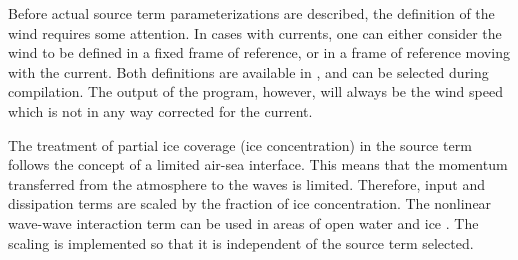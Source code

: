 \vspace{\baselineskip} \noindent
Before actual source term parameterizations are described, the definition of
the wind requires some attention. In cases with currents, one can either
consider the wind to be defined in a fixed frame of reference, or in a frame
of reference moving with the current. Both definitions are available in \ws,
and can be selected during compilation. The output of the program, however,
will always be the wind speed which is not in any way corrected for the
current.

\vspace{\baselineskip} \noindent
The treatment of partial ice coverage (ice concentration) in the source term
follows the concept of a limited air-sea interface. This means that the momentum
transferred from the atmosphere to the waves is limited. Therefore, input and
dissipation terms are scaled by the fraction of ice concentration. The
nonlinear wave-wave interaction term can be used in areas of open water
and ice \citep{art:PL07}. The scaling is implemented so that it is independent
of the source term selected.

